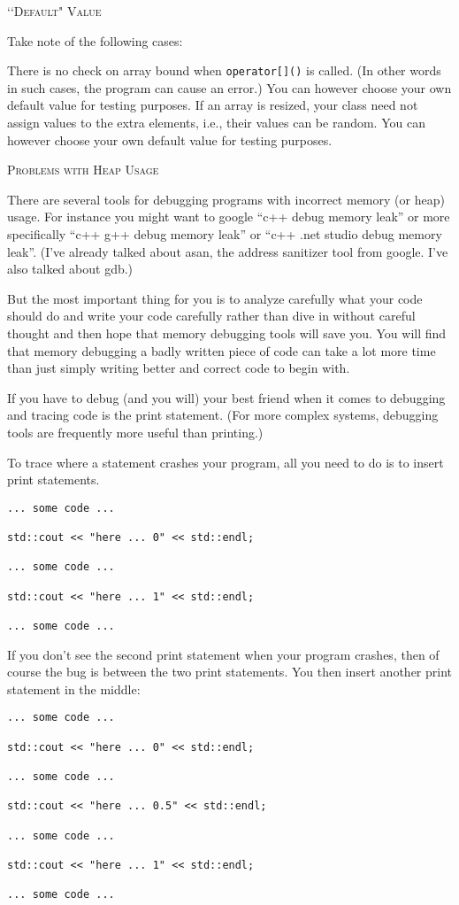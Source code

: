 \newpage
\textsc{\lq\lq Default" Value}

Take note of the following cases:
\begin{tightlist}
\li There is no check on array bound when \verb!operator[]()! is called. 
(In other words in such cases, the program can cause an error.) You can 
however choose your own default value for testing purposes.
\li If an array is resized, your class need not assign values to the extra 
elements, i.e., their values can be random. You can however choose your own 
default value for testing purposes.
\end{tightlist}


\newpage
\textsc{Problems with Heap Usage}

There are several tools for debugging programs with incorrect memory (or heap) 
usage.
For instance you might want to google “c++ debug memory leak” or more 
specifically “c++ g++ debug memory leak” or “c++ .net studio debug memory leak”.
(I've already talked about asan, the address sanitizer tool from google.
I've also talked about gdb.)

But the most important thing for you is to analyze carefully what your code 
should do and write your code carefully rather than dive in without careful 
thought and then hope that memory debugging tools will save you. You will find 
that memory debugging a badly written piece of code can take a lot more time than 
just simply writing better and correct code to begin with.

If you have to debug (and you will) your best friend when it comes to debugging 
and tracing code is the print statement. (For more complex systems, debugging tools 
are frequently more useful than printing.)

To trace where a statement crashes your program, all you need to do is to insert 
print statements. 
\begin{Verbatim}[frame=single,fontsize=\small]
... some code ...

std::cout << "here ... 0" << std::endl;

... some code ...

std::cout << "here ... 1" << std::endl;

... some code ...
\end{Verbatim}

If you don't see the second print statement when your program crashes, then of 
course the bug is between the two print statements. You then insert another print 
statement in the middle:
\begin{Verbatim}[frame=single,fontsize=\small]
... some code ...

std::cout << "here ... 0" << std::endl;

... some code ...

std::cout << "here ... 0.5" << std::endl;

... some code ...

std::cout << "here ... 1" << std::endl;

... some code ...
\end{Verbatim}

